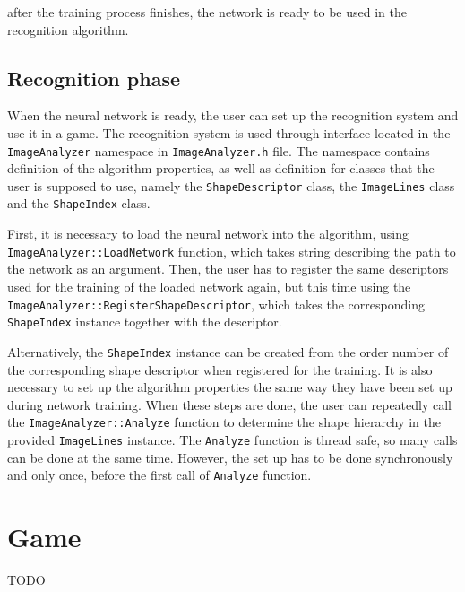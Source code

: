 after the training process finishes, the network is ready to be used in the recognition algorithm.

\subsection{Recognition phase}
When the neural network is ready, the user can set up the recognition system and use it in a game. The recognition system is used through interface located in the \texttt{ImageAnalyzer} namespace in \texttt{ImageAnalyzer.h} file. The namespace contains definition of the algorithm properties, as well as definition for classes that the user is supposed to use, namely the \texttt{ShapeDescriptor} class, the \texttt{ImageLines} class and the \texttt{ShapeIndex} class.

First, it is necessary to load the neural network into the algorithm, using \texttt{ImageAnalyzer::LoadNetwork} function, which takes string describing the path to the network as an argument. Then, the user has to register the same descriptors used for the training of the loaded network again, but this time using the \texttt{ImageAnalyzer::RegisterShapeDescriptor}, which takes the corresponding \texttt{ShapeIndex} instance together with the descriptor.

Alternatively, the \texttt{ShapeIndex} instance can be created from the order number of the corresponding shape descriptor when registered for the training. It is also necessary to set up the algorithm properties the same way they have been set up during network training. When these steps are done, the user can repeatedly call the \texttt{ImageAnalyzer::Analyze} function to determine the shape hierarchy in the provided \texttt{ImageLines} instance. The \texttt{Analyze} function is thread safe, so many calls can be done at the same time. However, the set up has to be done synchronously and only once, before the first call of \texttt{Analyze} function. 

\section{Game}
TODO
